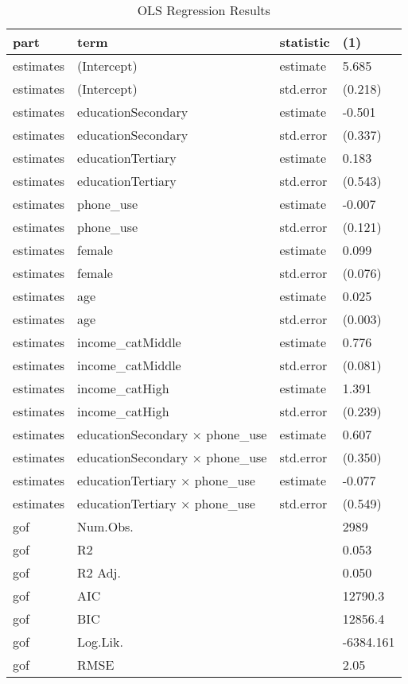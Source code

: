 \documentclass[
  11pt,
]{article}
\begin{document}
\begin{longtable}[l]{llll}
\caption{\label{tab:styled-table}OLS Regression Results}\\
\toprule
\textbf{part} & \textbf{term} & \textbf{statistic} & \textbf{(1)}\\
\midrule
estimates & (Intercept) & estimate & 5.685\\
estimates & (Intercept) & std.error & (0.218)\\
estimates & educationSecondary & estimate & -0.501\\
estimates & educationSecondary & std.error & (0.337)\\
estimates & educationTertiary & estimate & 0.183\\
\addlinespace
estimates & educationTertiary & std.error & (0.543)\\
estimates & phone\_use & estimate & -0.007\\
estimates & phone\_use & std.error & (0.121)\\
estimates & female & estimate & 0.099\\
estimates & female & std.error & (0.076)\\
\addlinespace
estimates & age & estimate & 0.025\\
estimates & age & std.error & (0.003)\\
estimates & income\_catMiddle & estimate & 0.776\\
estimates & income\_catMiddle & std.error & (0.081)\\
estimates & income\_catHigh & estimate & 1.391\\
\addlinespace
estimates & income\_catHigh & std.error & (0.239)\\
estimates & educationSecondary × phone\_use & estimate & 0.607\\
estimates & educationSecondary × phone\_use & std.error & (0.350)\\
estimates & educationTertiary × phone\_use & estimate & -0.077\\
estimates & educationTertiary × phone\_use & std.error & (0.549)\\
\addlinespace
gof & Num.Obs. &  & 2989\\
gof & R2 &  & 0.053\\
gof & R2 Adj. &  & 0.050\\
gof & AIC &  & 12790.3\\
gof & BIC &  & 12856.4\\
\addlinespace
gof & Log.Lik. &  & -6384.161\\
gof & RMSE &  & 2.05\\
\bottomrule
\end{longtable}
\end{document}
